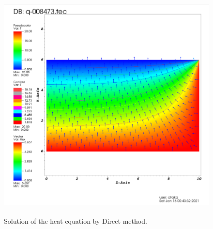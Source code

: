 \documentclass[letterpaper,12pt]{article}
\begin{document}
\begin{figure}[H] 
	\centering 
	\includegraphics[max height=12cm]{graphs/linegauss_norad/linegauss_norad.png}
	\caption{Solution of the heat equation by Direct method.}
 	\label{fig:directnorad}
\end{figure}
\end{document}
